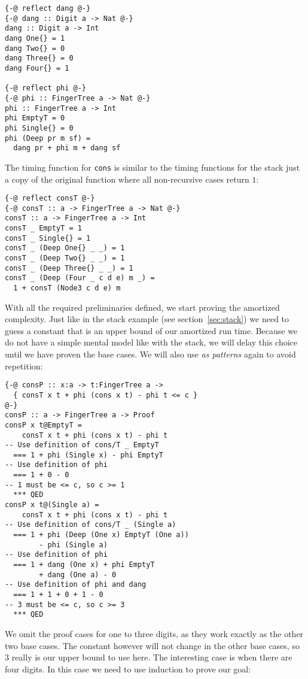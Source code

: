\documentclass[sigplan,screen,review,anonymous]{acmart}
\begin{document}
\begin{lstlisting}
{-@ reflect dang @-}
{-@ dang :: Digit a -> Nat @-}
dang :: Digit a -> Int
dang One{} = 1
dang Two{} = 0
dang Three{} = 0
dang Four{} = 1

{-@ reflect phi @-}
{-@ phi :: FingerTree a -> Nat @-}
phi :: FingerTree a -> Int
phi EmptyT = 0
phi Single{} = 0
phi (Deep pr m sf) =
  dang pr + phi m + dang sf
\end{lstlisting}

The timing function for \texttt{cons} is similar to the timing functions for the stack just a copy of the original function where all non-recursive cases return $1$:

\begin{lstlisting}
{-@ reflect consT @-}
{-@ consT :: a -> FingerTree a -> Nat @-}
consT :: a -> FingerTree a -> Int
consT _ EmptyT = 1
consT _ Single{} = 1
consT _ (Deep One{} _ _) = 1
consT _ (Deep Two{} _ _) = 1
consT _ (Deep Three{} _ _) = 1
consT _ (Deep (Four _ c d e) m _) =
  1 + consT (Node3 c d e) m
\end{lstlisting}

With all the required preliminaries defined, we start proving the amortized complexity. Just like in the stack example (see section~\ref{sec:stack}) we need to guess a constant that is an upper bound of our amortized run time. Because we do not have a simple mental model like with the stack, we will delay this choice until we have proven the base cases. We will also use \textit{as patterns} again to avoid repetition:

\begin{lstlisting}
{-@ consP :: x:a -> t:FingerTree a ->
  { consT x t + phi (cons x t) - phi t <= c }
@-}
consP :: a -> FingerTree a -> Proof
consP x t@EmptyT =
    consT x t + phi (cons x t) - phi t
-- Use definition of cons/T _ EmptyT
  === 1 + phi (Single x) - phi EmptyT
-- Use definition of phi
  === 1 + 0 - 0
-- 1 must be <= c, so c >= 1
  *** QED
consP x t@(Single a) =
    consT x t + phi (cons x t) - phi t
-- Use definition of cons/T _ (Single a)
  === 1 + phi (Deep (One x) EmptyT (One a))
        - phi (Single a)
-- Use definition of phi
  === 1 + dang (One x) + phi EmptyT
        + dang (One a) - 0
-- Use definition of phi and dang
  === 1 + 1 + 0 + 1 - 0
-- 3 must be <= c, so c >= 3
  *** QED
\end{lstlisting}

We omit the proof cases for one to three digits, as they work exactly as the other two base cases. The constant however will not change in the other base cases, so $3$ really is our upper bound to use here. The interesting case is when there are four digits. In this case we need to use induction to prove our goal:
\end{document}
